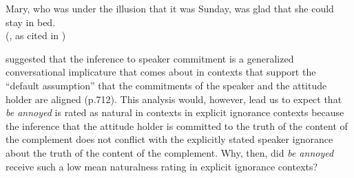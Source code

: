 \documentclass[11pt,fleqn]{article}
\newcommand{\6}{\mbox{$[\hspace*{-.6mm}[$}}
\newcommand{\9}{\mbox{$]\hspace*{-.6mm}]$}}
\begin{document}
\begin{exe}
\ex\label{emo} 
Mary, who was under the illusion that it was Sunday, was glad that she could stay in bed. \\ \hspace*{.2cm} \hfill (\citealt{klein1975}, as cited in \citealt[122]{gazdar79a})
\end{exe}
\citealt{karttunen2016} suggested that the inference to speaker commitment is a generalized conversational implicature that comes about in contexts that support the ``default assumption'' that the commitments of the speaker and the attitude holder are aligned (p.712). This analysis would, however, lead us to expect that {\em be annoyed} is rated as natural in contexts in explicit ignorance contexts because the inference that the attitude holder is committed to the truth of the content of the complement does not conflict with the explicitly stated speaker ignorance about the truth of the content of the complement. Why, then, did {\em be annoyed} receive such a low mean naturalness rating in explicit ignorance contexts? 
\end{document}
